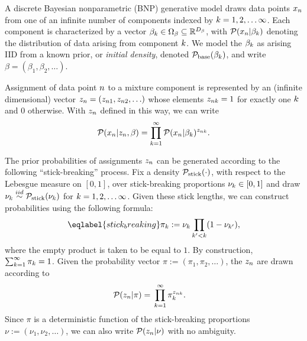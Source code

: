 A discrete Bayesian nonparametric (BNP) generative model draws data points
$x_n$ from one of an infinite number of components indexed by $k = 1, 2,
\ldots \infty$. Each component is characterized by a vector $\beta_k \in
\Omega_{\beta} \subseteq \mathbb{R}^{{D_{\beta}}}$, with $\mathcal{P}(x_n \vert \beta_k)$
denoting the distribution of data arising from  component $k$. We model the
$\beta_k$ as arising IID from a known prior, or \textit{initial density},
denoted $\mathcal{P}_{\mathrm{base}}(\beta_k)$, and write $\beta = (\beta_1, \beta_2, \ldots)$.

Assignment of data point $n$ to a mixture component is represented by an
(infinite dimensional) vector $z_n = (z_{n1}, z_{n2}, \ldots)$ whose
elements $z_{nk} = 1$ for exactly one $k$ and $0$ otherwise. With $z_n$
defined in this way, we can write
%
\begin{align*}
%
\p(\x_n \vert \z_\n, \beta) =
    \prod_{k=1}^\infty \p(\x_n \vert \beta_\k)^{\z_{\n\k}}.
%
\end{align*}

The prior probabilities of assignments $z_{n}$ can be generated according to
the following ``stick-breaking'' process. Fix a density $\mathcal{P}_{\mathrm{stick}}(\cdot)$, with
respect to the Lebesgue measure on $[0,1]$, over stick-breaking proportions
$\nu_{k} \in [0, 1]$ and draw $\nu_{k}\overset{iid}{\sim}\mathcal{P}_{\mathrm{stick}}(\nu_{k})$ for $k=1,2,\ldots\infty$.
Given these stick lengths, we can construct probabilities using the following
formula:
%
\begin{align}\eqlabel{stick_breaking}
%
\pi_\k := \nuk \prod_{\k' < \k} (1 - \nu_{\k'}),
%
\end{align}
%
where the empty product is taken to be equal to $1$. By construction,
$\sum_{k=1}^{\infty} \pi_k = 1$. Given the probability vector $\pi := (\pi_1,
\pi_2, \ldots)$, the $z_n$ are drawn according to
%
\begin{align*}
%
\p(\z_\n \vert \pi) ={}&
   \prod_{k=1}^{\infty} \pi_\k^{\z_{\n\k}}.
%
\end{align*}
%
Since $\pi$ is a deterministic function of the stick-breaking proportions $\nu :=
(\nu_1, \nu_2, \ldots)$, we can also write $\mathcal{P}(z_n \vert \nu)$ with no
ambiguity.

